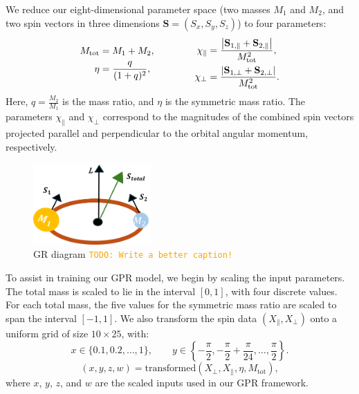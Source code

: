 \documentclass[12pt]{article}
\newcommand{\todo}[1]{\textcolor{orange}{\texttt{TODO: #1}}}
\begin{document}
We reduce our eight-dimensional parameter space (two masses \(M_1\) and \(M_2\), and two spin vectors in three dimensions \(\mathbf{S} = (S_x, S_y, S_z)\)) to four parameters:
\begin{align}
    \begin{aligned}
    M_{\mathrm{tot}} & = M_1 + M_2, \\
    \eta & = \frac{q}{(1 + q)^2},
    \end{aligned}
    \hspace{1.5cm}
    \begin{aligned}
    \chi_{\parallel} &= \frac{\left|\mathbf{S}_{1,\parallel} + \mathbf{S}_{2,\parallel}\right|}{M_{\mathrm{tot}}^2}, \\
    \chi_{\perp} &= \frac{\left|\mathbf{S}_{1,\perp} + \mathbf{S}_{2,\perp}\right|}{M_{\mathrm{tot}}^2}.
    \end{aligned}
\end{align}
Here, \( q = \frac{M_2}{M_1} \) is the mass ratio, and \( \eta \) is the symmetric mass ratio. The parameters \( \chi_{\parallel} \) and \( \chi_{\perp} \) correspond to the magnitudes of the combined spin vectors projected parallel and perpendicular to the orbital angular momentum, respectively.
\begin{figure}[H]
    \centering
    \includegraphics[width=0.4\textwidth]{LatexPlots/GRdiagram.png}
    \caption{GR diagram \todo{Write a better caption!}}
    \label{fig:gr_diagram}
\end{figure}
To assist in training our GPR model, we begin by scaling the input parameters. The total mass is scaled to lie in the interval \([0, 1]\), with four discrete values. For each total mass, the five values for the symmetric mass ratio are scaled to span the interval \([-1, 1]\). 
We also transform the spin data \((X_{\parallel}, X_{\perp})\) onto a uniform grid of size \(10 \times 25\), with:
\[
x \in \{0.1, 0.2, \ldots, 1\}, \qquad y \in \left\{-\frac{\pi}{2},-\frac{\pi}{2}+\frac{\pi}{24},\ldots, \frac{\pi}{2}\right\}.
\]
\begin{equation}
(x, y, z, w) = \text{transformed}(X_{\perp}, X_{\parallel}, \eta, M_{\text{tot}}),
\end{equation}
where \(x\), \(y\), \(z\), and \(w\) are the scaled inputs used in our GPR framework.
\end{document}
